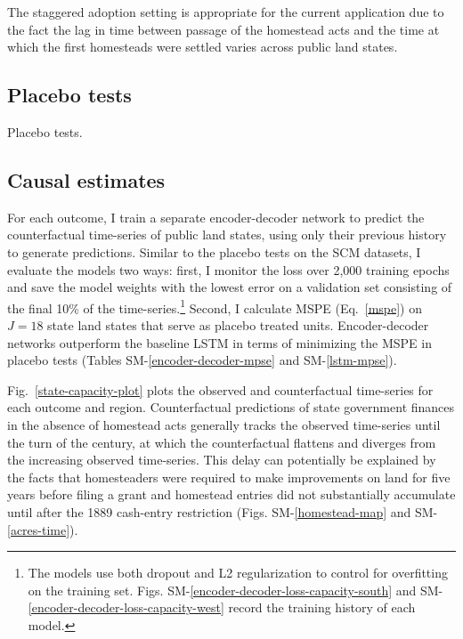 \documentclass[12pt]{article}
\begin{document}

The staggered adoption setting is appropriate for the current application due to the fact the lag in time between passage of the homestead acts and the time at which the first homesteads were settled varies across public land states.

\subsection{Placebo tests} \label{placebo-tests}
%

\begin{table}[htbp]
	\caption{Placebo tests.}
	\label{placebo-tests}
	\let\center\empty
	\let\endcenter\relax
	\centering
	\resizebox{.65\width}{!}{}
\end{table}

\subsection{Causal estimates}
For each outcome, I train a separate encoder-decoder network to predict the counterfactual time-series of public land states, using only their previous history to generate predictions. Similar to the placebo tests on the SCM datasets, I evaluate the models two ways: first, I monitor the loss over 2,000 training epochs and save the model weights with the lowest error on a validation set consisting of the final 10\% of the time-series.\footnote{The models use both dropout and L2 regularization to control for overfitting on the training set. Figs. SM-\ref{encoder-decoder-loss-capacity-south} and SM-\ref{encoder-decoder-loss-capacity-west} record the training history of each model.} Second, I calculate MSPE (Eq.~\ref{mspe}) on $J=18$ state land states that serve as placebo treated units. Encoder-decoder networks outperform the baseline LSTM in terms of minimizing the MSPE in placebo tests (Tables SM-\ref{encoder-decoder-mpse} and SM-\ref{lstm-mpse}).

Fig.~\ref{state-capacity-plot} plots the observed and counterfactual time-series for each outcome and region. Counterfactual predictions of state government finances in the absence of homestead acts generally tracks the observed time-series until the turn of the century, at which the counterfactual flattens and diverges from the increasing observed time-series. This delay can potentially be explained by the facts that homesteaders were required to make improvements on land for five years before filing a grant and homestead entries did not substantially accumulate until after the 1889 cash-entry restriction (Figs. SM-\ref{homestead-map} and SM-\ref{acres-time}). 
\end{document}
